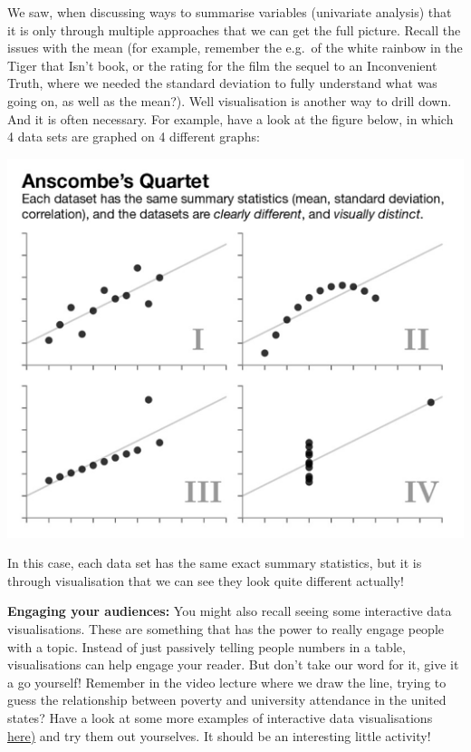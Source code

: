 \documentclass[
]{book}
\begin{document}
We saw, when discussing ways to summarise variables (univariate analysis) that it is only through multiple approaches that we can get the full picture. Recall the issues with the mean (for example, remember the e.g.~of the white rainbow in the Tiger that Isn't book, or the rating for the film the sequel to an Inconvenient Truth, where we needed the standard deviation to fully understand what was going on, as well as the mean?). Well visualisation is another way to drill down. And it is often necessary. For example, have a look at the figure below, in which 4 data sets are graphed on 4 different graphs:

\includegraphics{imgs/diff_viz_same_sums.png}

In this case, each data set has the same exact summary statistics, but it is through visualisation that we can see they look quite different actually!

\textbf{Engaging your audiences:} You might also recall seeing some interactive data visualisations. These are something that has the power to really engage people with a topic. Instead of just passively telling people numbers in a table, visualisations can help engage your reader. But don't take our word for it, give it a go yourself! Remember in the video lecture where we draw the line, trying to guess the relationship between poverty and university attendance in the united states? Have a look at some more examples of interactive data visualisations \href{https://www.tableau.com/en-gb/learn/articles/interactive-map-and-data-visualization-examples}{here)} and try them out yourselves. It should be an interesting little activity!
\end{document}
